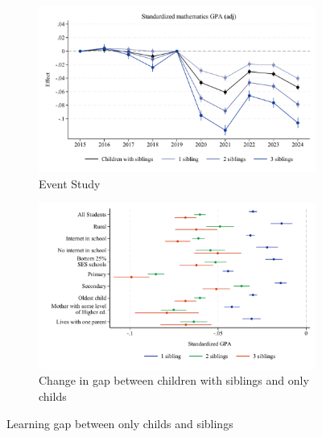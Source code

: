 \begin{figure}[htbp]
    \centering
    
    \begin{subfigure}{\textwidth}
        \centering
        \includegraphics[width=\textwidth]{./FIGURES/Event Study/covid_std_gpa_m_adj_all_all_all_elm_all.pdf}
        \caption{Event Study}
        \label{fig:fig2a}
    \end{subfigure}
    
    \vspace{1em} %
    
    \begin{subfigure}{\textwidth}
        \centering
        \includegraphics[width=\textwidth]{./FIGURES/TWFE/covid_twfe_summ_bysibs_all_20-21_gpa_m_adj_Tsiblings_Soldest_4.pdf}
        \caption{Change in gap between children with siblings and only childs}
        \label{fig:fig2b}
    \end{subfigure}
    
    \caption{Learning gap between only childs and siblings}
    \label{fig:fig2}
\end{figure}


\clearpage
















